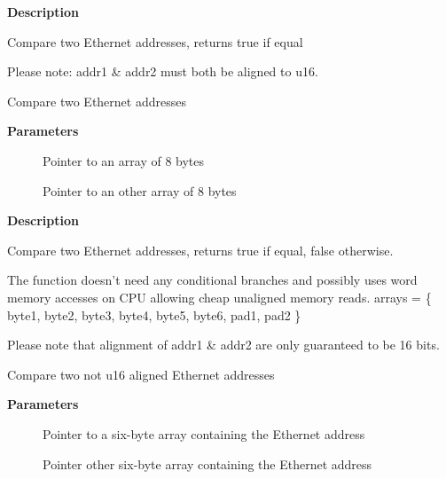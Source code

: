 \documentclass[a4paper,8pt,english]{sphinxmanual}
\begin{document}
\textbf{Description}

Compare two Ethernet addresses, returns true if equal

Please note: addr1 \& addr2 must both be aligned to u16.

\begin{fulllineitems}
\label{networking/kapi:c.ether_addr_equal_64bits}
Compare two Ethernet addresses

\end{fulllineitems}


\textbf{Parameters}
\begin{description}
\item[{}] \leavevmode
Pointer to an array of 8 bytes

\item[{}] \leavevmode
Pointer to an other array of 8 bytes

\end{description}

\textbf{Description}

Compare two Ethernet addresses, returns true if equal, false otherwise.

The function doesn't need any conditional branches and possibly uses
word memory accesses on CPU allowing cheap unaligned memory reads.
arrays = \{ byte1, byte2, byte3, byte4, byte5, byte6, pad1, pad2 \}

Please note that alignment of addr1 \& addr2 are only guaranteed to be 16 bits.

\begin{fulllineitems}
\label{networking/kapi:c.ether_addr_equal_unaligned}
Compare two not u16 aligned Ethernet addresses

\end{fulllineitems}


\textbf{Parameters}
\begin{description}
\item[{}] \leavevmode
Pointer to a six-byte array containing the Ethernet address

\item[{}] \leavevmode
Pointer other six-byte array containing the Ethernet address

\end{description}
\end{document}
